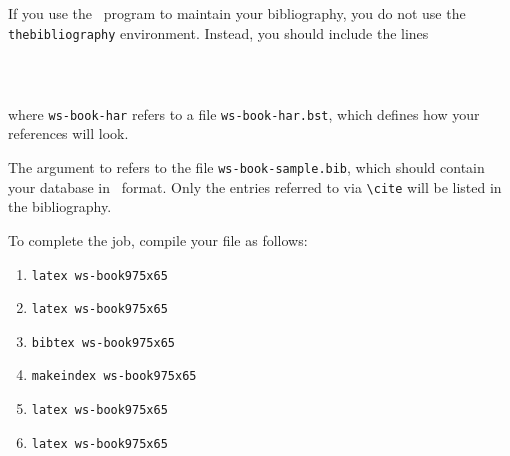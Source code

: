 \section{\btex}\index{\btex}
If you use the \btex\ program to maintain your bibliography, you do
not use the \verb|thebibliography| environment. Instead, you should
include the lines

\begin{verbatim}
   
   
\end{verbatim}

\noindent where \verb|ws-book-har| refers to a file
\verb|ws-book-har.bst|, which defines how your references will look.

The argument to \verb|| refers to the file \verb|ws-book-sample.bib|,
which should contain your database in \btex\ format. Only the
entries referred to via \verb|\cite| will be listed in the
bibliography.

\newpage

To complete the job, compile your file as follows:

\begin{enumerate}[(6)]
\item \verb|latex ws-book975x65|
\item \verb|latex ws-book975x65|
\item \verb|bibtex ws-book975x65|
\item \verb|makeindex ws-book975x65|
\item \verb|latex ws-book975x65|
\item \verb|latex ws-book975x65|
\end{enumerate}
